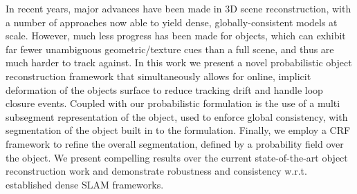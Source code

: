 In recent years, major advances have been made in 3D scene reconstruction, with a number of approaches now able to yield dense, globally-consistent models at scale. However, much less progress has been made for objects, which can exhibit far fewer unambiguous geometric/texture cues than a full scene, and thus are much harder to track against.
In this work we present a novel probabilistic object reconstruction framework that simultaneously allows for online, implicit deformation of the objects surface to reduce tracking drift and handle 
loop closure events. Coupled with our probabilistic formulation is the use of a multi subsegment representation of the object, used to enforce global consistency, with segmentation of the object 
built in to the formulation. Finally, we employ a CRF framework to refine the overall segmentation, defined by a probability field over the object. We present compelling results over the current state-of-the-art 
object reconstruction work and demonstrate robustness and consistency w.r.t. established dense SLAM frameworks.
